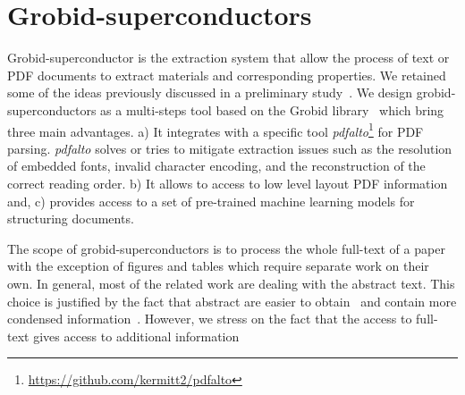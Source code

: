 \documentclass{article}
\begin{document}



\section{Grobid-superconductors}

Grobid-superconductor is the extraction system that allow the process of text or PDF documents to extract materials and corresponding properties. 
We retained some of the ideas previously discussed in a preliminary study~\cite{foppiano:hal-02870896}.  
We design grobid-superconductors as a multi-steps tool based on the Grobid library~\cite{GROBID} which bring three main advantages. 
a) It integrates with a specific tool \textit{pdfalto}\footnote{\url{https://github.com/kermitt2/pdfalto}} for PDF parsing. \textit{pdfalto} solves or tries to mitigate extraction issues such as the resolution of embedded fonts, invalid character encoding, and the reconstruction of the correct reading order. 
b) It allows to access to low level layout PDF information and, c) provides access to a set of pre-trained machine learning models for structuring documents.

The scope of grobid-superconductors is to process the whole full-text of a paper with the exception of figures and tables which require separate work on their own. 
In general, most of the related work are dealing with the abstract text. This choice is  justified by the fact that abstract are easier to obtain~\cite{kononova_text-mined_2019} and contain more condensed information~\cite{yamaguchi-etal-2020-sc, court_magnetic_2020}. However, we stress on the fact that the access to full-text gives access to additional information 
\end{document}
